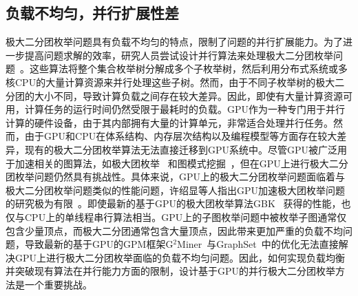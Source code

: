 \subsection{负载不均匀，并行扩展性差}

极大二分团枚举问题具有负载不均匀的特点，限制了问题的并行扩展能力。为了进一步提高问题求解的效率，研究人员尝试设计并行算法来处理极大二分团枚举问题~\cite{mapreduceMBE16, MBEHe18, parMBE19}。这些算法将整个集合枚举树分解成多个子枚举树，然后利用分布式系统或多核CPU的大量计算资源来并行处理这些子树。然而，由于不同子枚举树的极大二分团的大小不同，导致计算负载之间存在较大差异。因此，即使有大量计算资源可用，计算任务的运行时间仍然受限于最耗时的负载。GPU作为一种专门用于并行计算的硬件设备，由于其内部拥有大量的计算单元，非常适合处理并行任务。然而，由于GPU和CPU在体系结构、内存层次结构以及编程模型等方面存在较大差异，现有的极大二分团枚举算法无法直接迁移到GPU系统中。尽管GPU被广泛用于加速相关的图算法，如极大团枚举~\cite{MCEGPUBitset13,MCEGPUdpp17,MCE-GPU21} 和图模式挖掘~\cite{g2miner22,SubgraphGpu22,Kclique22,stmatch22}，但在GPU上进行极大二分团枚举问题仍然具有挑战性。具体来说，GPU上的极大二分团枚举问题面临着与极大二分团枚举问题类似的性能问题，许绍显等人指出GPU加速极大团枚举问题的研究极为有限~\cite{MCEreview22}。即使最新的基于GPU的极大团枚举算法GBK~\cite{MCE-GPU21} 获得的性能，也仅与CPU上的单线程串行算法相当。GPU上的子图枚举问题中被枚举子图通常仅包含少量顶点，而极大二分团通常包含大量顶点，因此带来更加严重的负载不均问题，导致最新的基于GPU的GPM框架G$^2$Miner~\cite{g2miner22}与GraphSet~\cite{Graphset23}中的优化无法直接解决GPU上进行极大二分团枚举面临的负载不均匀问题。因此，如何实现负载均衡并突破现有算法在并行能力方面的限制，设计基于GPU的并行极大二分团枚举方法是一个重要挑战。